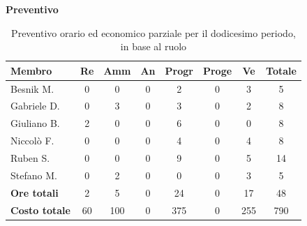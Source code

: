 \documentclass[a4paper,10pt]{article}
\begin{document}
\textbf{Preventivo} \\
\begin{table}[H]
\centering
\begin{tabular}{|l|c|c|c|c|c|c|c|}
\hline
\textbf{Membro} & \textbf{Re} & \textbf{Amm} & \textbf{An} & \textbf{Progr} & \textbf{Proge} & \textbf{Ve} & \textbf{Totale} \\
\hline
Besnik M.   & 0 & 0 & 0 & 2   & 0 & 3   & 5  \\
Gabriele D. & 0 & 3 & 0 & 3   & 0 & 2   & 8  \\
Giuliano B. & 2 & 0 & 0 & 6   & 0 & 0   & 8  \\
Niccolò F.  & 0 & 0 & 0 & 4   & 0 & 4   & 8  \\
Ruben S.    & 0 & 0 & 0 & 9   & 0 & 5   & 14 \\
Stefano M.  & 0 & 2 & 0 & 0   & 0 & 3   & 5  \\
\hline
\textbf{Ore totali} & 2  & 5 & 0 & 24  & 0 & 17 & 48 \\
\hline
\textbf{Costo totale} & 60 & 100 & 0 & 375  & 0  & 255 & 790 \\
\hline
\end{tabular}
\caption{Preventivo orario ed economico parziale per il dodicesimo periodo, in base al ruolo}
\end{table}
\end{document}
